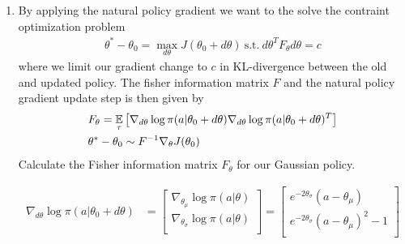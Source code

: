 \documentclass{exam}
\begin{document}
\begin{enumerate}
\begin{solutionorlines}[2in]
        \end{solutionorlines}
    \item By applying the natural policy gradient we want to the solve the contraint optimization problem
        \begin{align*}
            \theta^{*} - \theta_0 = \max_{d\theta} J(\theta_0 + d\theta) \   \text{s.t.} \   d\theta^T F_{\theta} d\theta = c
        \end{align*}
    where we limit our gradient change to $c$ in KL-divergence between the old and updated policy. The fisher information matrix $F$ and the natural policy gradient update step is then given by
    \begin{align*}
        &F_{\theta} = \operatorname*{\mathbb{E}}_{\tau} \big[ \nabla_{d\theta} \log \pi(a | \theta_0 + d\theta) \nabla_{d\theta} \log \pi(a | \theta_0 + d\theta)^T \big] \\
        &\theta^{*} - \theta_0 \sim F^{-1} \nabla_{\theta} J(\theta_0)
    \end{align*}
    Calculate the Fisher information matrix $F_{\theta}$ for our Gaussian policy.
        \begin{solutionorlines}[2in]
            \begin{align*}
                \nabla_{d\theta} \log \pi(a | \theta_0 + d\theta) &= \begin{bmatrix}
                    \nabla_{\theta_\mu} \log \pi(a | \theta) \\
                    \nabla_{\theta_\sigma} \log \pi(a | \theta) \\
                \end{bmatrix} =
                \begin{bmatrix}
                    e^{-2\theta_\sigma}(a - \theta_{\mu}) \\
                    e^{-2\theta_\sigma}(a - \theta_{\mu})^2 - 1 \\
                \end{bmatrix}
            \end{align*}
            

\end{solutionorlines}
\end{enumerate}
\end{document}

